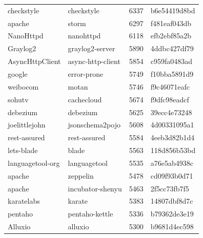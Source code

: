 \begin{longtable}{l | l | l | l}
    checkstyle          & checkstyle                & 6337  & b6e54419d8bd                            \\
    apache              & storm                     & 6297  & f481eaf043db                            \\
    NanoHttpd           & nanohttpd                 & 6118  & efb2ebf85a2b                            \\
    Graylog2            & graylog2-server           & 5890  & 4ddbc427df79                            \\
    AsyncHttpClient     & async-http-client         & 5854  & c959fa0483ad                            \\
    google              & error-prone               & 5749  & f10bba5891d9                            \\
    weibocom            & motan                     & 5746  & f9c46071eafc                            \\
    sohutv              & cachecloud                & 5674  & f9dfc98eadcf                            \\
    debezium            & debezium                  & 5625  & 39ecc4e73248                            \\
    joelittlejohn       & jsonschema2pojo           & 5608  & 4d00331095a1                            \\
    rest-assured        & rest-assured              & 5584  & 4eeb3d82b1d4                            \\
    lets-blade          & blade                     & 5563  & 118d856b53bd                            \\
    languagetool-org    & languagetool              & 5535  & a76e5ab4938c                            \\
    apache              & zeppelin                  & 5478  & cd09f93b0d71                            \\
    apache              & incubator-shenyu          & 5463  & 2f5cc73fb7f5                            \\
    karatelabs          & karate                    & 5383  & 14807dbf8d7c                            \\
    pentaho             & pentaho-kettle            & 5336  & b79362de3e19                            \\
    Alluxio             & alluxio                   & 5300  & b9681d4ec598                            \\

\end{longtable}
